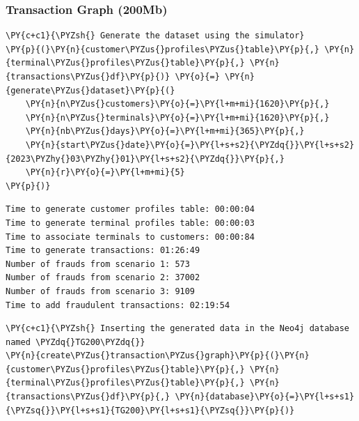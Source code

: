     \hypertarget{transaction-graph-200mb}{%
\subsubsection{Transaction Graph
(200Mb)}\label{transaction-graph-200mb}}

    \begin{tcolorbox}[breakable, size=fbox, boxrule=1pt, pad at break*=1mm,colback=cellbackground, colframe=cellborder]
\begin{Verbatim}[commandchars=\\\{\}]
\PY{c+c1}{\PYZsh{} Generate the dataset using the simulator}
\PY{p}{(}\PY{n}{customer\PYZus{}profiles\PYZus{}table}\PY{p}{,} \PY{n}{terminal\PYZus{}profiles\PYZus{}table}\PY{p}{,} \PY{n}{transactions\PYZus{}df}\PY{p}{)} \PY{o}{=} \PY{n}{generate\PYZus{}dataset}\PY{p}{(}
    \PY{n}{n\PYZus{}customers}\PY{o}{=}\PY{l+m+mi}{1620}\PY{p}{,}
    \PY{n}{n\PYZus{}terminals}\PY{o}{=}\PY{l+m+mi}{1620}\PY{p}{,}
    \PY{n}{nb\PYZus{}days}\PY{o}{=}\PY{l+m+mi}{365}\PY{p}{,}
    \PY{n}{start\PYZus{}date}\PY{o}{=}\PY{l+s+s2}{\PYZdq{}}\PY{l+s+s2}{2023\PYZhy{}03\PYZhy{}01}\PY{l+s+s2}{\PYZdq{}}\PY{p}{,}
    \PY{n}{r}\PY{o}{=}\PY{l+m+mi}{5}
\PY{p}{)}
\end{Verbatim}
\end{tcolorbox}

    \begin{Verbatim}[commandchars=\\\{\}]
Time to generate customer profiles table: 00:00:04
Time to generate terminal profiles table: 00:00:03
Time to associate terminals to customers: 00:00:84
Time to generate transactions: 01:26:49
Number of frauds from scenario 1: 573
Number of frauds from scenario 2: 37002
Number of frauds from scenario 3: 9109
Time to add fraudulent transactions: 02:19:54
    \end{Verbatim}

    \begin{tcolorbox}[breakable, size=fbox, boxrule=1pt, pad at break*=1mm,colback=cellbackground, colframe=cellborder]
\begin{Verbatim}[commandchars=\\\{\}]
\PY{c+c1}{\PYZsh{} Inserting the generated data in the Neo4j database named \PYZdq{}TG200\PYZdq{}}
\PY{n}{create\PYZus{}transaction\PYZus{}graph}\PY{p}{(}\PY{n}{customer\PYZus{}profiles\PYZus{}table}\PY{p}{,} \PY{n}{terminal\PYZus{}profiles\PYZus{}table}\PY{p}{,} \PY{n}{transactions\PYZus{}df}\PY{p}{,} \PY{n}{database}\PY{o}{=}\PY{l+s+s1}{\PYZsq{}}\PY{l+s+s1}{TG200}\PY{l+s+s1}{\PYZsq{}}\PY{p}{)}
\end{Verbatim}
\end{tcolorbox}


